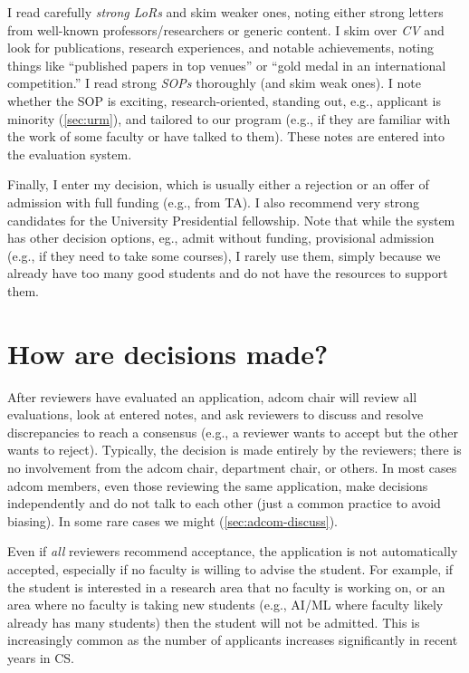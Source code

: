 \documentclass[oneside,11pt,dvipsnames]{book}
\def\sectioninfo#1{%
  \addcontentsline{toc}{sectioninfo}{%
    \noexpand\numberline{}\color{black}{#1}}%
}
\begin{document}
I read carefully \emph{strong LoRs} and skim weaker ones, noting either strong letters from well-known professors/researchers or generic content. I skim over \emph{CV} and look for publications, research experiences, and notable achievements, noting things like ``published papers in top venues'' or ``gold medal in an international competition.''
I read strong \emph{SOPs} thoroughly (and skim weak ones). I note whether the SOP is exciting, research-oriented, standing out, e.g., applicant is minority (\autoref{sec:urm}), and tailored to our program (e.g., if they are familiar with the work of some faculty or have talked to them). These notes are entered into the evaluation system.

Finally, I enter my decision, which is usually either a rejection or an offer of admission with full funding (e.g., from TA). I also recommend very strong candidates for the University Presidential fellowship. Note that while the system has other decision options, eg., admit without funding, provisional admission (e.g., if they need to take some courses), I rarely use them, simply because we already have too many good students and do not have the resources to support them.  

\section{How are decisions made?}\label{sec:how-decisions}
\sectioninfo{Even if all adcom reviewers recommend acceptance, the application can still be rejected. Vice versa, if all reviewers think the application is weak, the student might still be admitted.}

After reviewers have evaluated an application, adcom chair will review all evaluations, look at entered notes, and ask reviewers to discuss and resolve discrepancies to reach a consensus (e.g., a reviewer wants to accept but the other wants to reject).  Typically, the decision is made entirely by the reviewers; there is no involvement from the adcom chair, department chair, or others. In most cases adcom members, even those reviewing the same application, make decisions independently and do not talk to each other (just a common practice to avoid biasing). In some rare cases we might (\autoref{sec:adcom-discuss}).


Even if \emph{all} reviewers recommend acceptance, the application is not automatically accepted, especially if no faculty is willing to advise the student. For example, if the student is interested in a research area that no faculty is working on, or an area where no faculty is taking new students (e.g., AI/ML where faculty likely already has many students) then the student will not be admitted.  This is increasingly common as the number of applicants increases significantly in recent years in CS.
\end{document}
